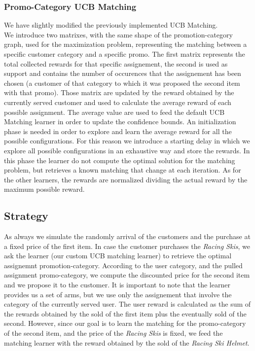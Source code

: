 \subsubsection*{Promo-Category UCB Matching}
We have slightly modified the previously implemented UCB Matching. \\
We introduce two matrixes, with the same shape of the promotion-category graph, used for the maximization problem, representing the matching between a specific customer category and a specific promo. The first matrix represents the total collected rewards for that specific assignement, the second is used as support and contains the number of occurences that the assignement has been chosen (a customer of that category to which it was proposed the second item with that promo). 
Those matrix are updated by the reward obtained by the currently served customer and used to calculate the average reward of each possible assignment. The average value are used to feed the default UCB Matching learner in order to update the confidence bounds. An initialization phase is needed in order to explore and learn the average reward for all the possible configurations. For this reason we introduce a starting delay in which we explore all possible configurations in an exhaustive way and store the rewards. In this phase the learner do not compute the optimal solution for the matching problem, but retrieves a known matching that change at each iteration.
As for the other learners, the rewards are normalized dividing the actual reward by the maximum possible reward.

\subsection*{Strategy}

As always we simulate the randomly arrival of the customers and the purchase at a fixed price of the first item. In case the customer purchases the \textit{Racing Skis}, we ask the learner (our custom UCB matching learner) to retrieve the optimal assignemnt promotion-category. According to the user category, and the pulled assignment promo-category, we compute the discounted price for the second item and we propose it to the customer. It is important to note that the learner provides us a set of arms, but we use only the assignement that involve the category of the currently served user. The user reward is calculated as the sum of the rewards obtained by the sold of the first item plus the eventually sold of the second. However, since our goal is to learn the matching for the promo-category of the second item, and the price of the \textit{Racing Skis} is fixed, we feed the matching learner with the reward obtained by the sold of the \textit{Racing Ski Helmet}. 

